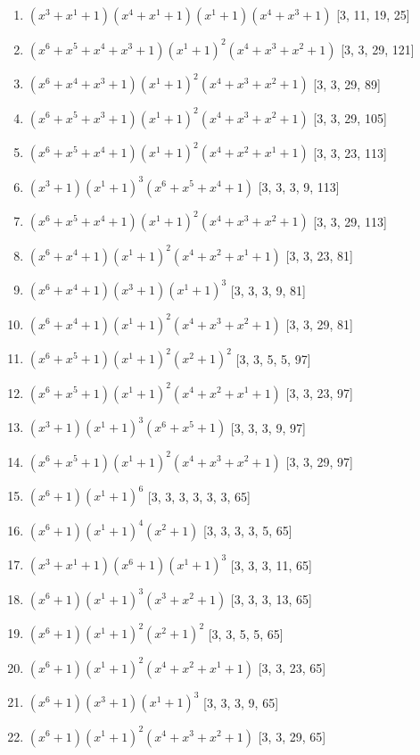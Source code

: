 \documentclass[10pt,twocolumn]{article}
\begin{document}
\begin{enumerate}
\item $(x^{3} + x^{1} + 1)(x^{4} + x^{1} + 1)(x^{1} + 1)(x^{4} + x^{3} + 1)$  [3, 11, 19, 25]
\item $(x^{6} + x^{5} + x^{4} + x^{3} + 1)(x^{1} + 1)^{2}(x^{4} + x^{3} + x^{2} + 1)$  [3, 3, 29, 121]
\item $(x^{6} + x^{4} + x^{3} + 1)(x^{1} + 1)^{2}(x^{4} + x^{3} + x^{2} + 1)$  [3, 3, 29, 89]
\item $(x^{6} + x^{5} + x^{3} + 1)(x^{1} + 1)^{2}(x^{4} + x^{3} + x^{2} + 1)$  [3, 3, 29, 105]
\item $(x^{6} + x^{5} + x^{4} + 1)(x^{1} + 1)^{2}(x^{4} + x^{2} + x^{1} + 1)$  [3, 3, 23, 113]
\item $(x^{3} + 1)(x^{1} + 1)^{3}(x^{6} + x^{5} + x^{4} + 1)$  [3, 3, 3, 9, 113]
\item $(x^{6} + x^{5} + x^{4} + 1)(x^{1} + 1)^{2}(x^{4} + x^{3} + x^{2} + 1)$  [3, 3, 29, 113]
\item $(x^{6} + x^{4} + 1)(x^{1} + 1)^{2}(x^{4} + x^{2} + x^{1} + 1)$  [3, 3, 23, 81]
\item $(x^{6} + x^{4} + 1)(x^{3} + 1)(x^{1} + 1)^{3}$  [3, 3, 3, 9, 81]
\item $(x^{6} + x^{4} + 1)(x^{1} + 1)^{2}(x^{4} + x^{3} + x^{2} + 1)$  [3, 3, 29, 81]
\item $(x^{6} + x^{5} + 1)(x^{1} + 1)^{2}(x^{2} + 1)^{2}$  [3, 3, 5, 5, 97]
\item $(x^{6} + x^{5} + 1)(x^{1} + 1)^{2}(x^{4} + x^{2} + x^{1} + 1)$  [3, 3, 23, 97]
\item $(x^{3} + 1)(x^{1} + 1)^{3}(x^{6} + x^{5} + 1)$  [3, 3, 3, 9, 97]
\item $(x^{6} + x^{5} + 1)(x^{1} + 1)^{2}(x^{4} + x^{3} + x^{2} + 1)$  [3, 3, 29, 97]
\item $(x^{6} + 1)(x^{1} + 1)^{6}$  [3, 3, 3, 3, 3, 3, 65]
\item $(x^{6} + 1)(x^{1} + 1)^{4}(x^{2} + 1)$  [3, 3, 3, 3, 5, 65]
\item $(x^{3} + x^{1} + 1)(x^{6} + 1)(x^{1} + 1)^{3}$  [3, 3, 3, 11, 65]
\item $(x^{6} + 1)(x^{1} + 1)^{3}(x^{3} + x^{2} + 1)$  [3, 3, 3, 13, 65]
\item $(x^{6} + 1)(x^{1} + 1)^{2}(x^{2} + 1)^{2}$  [3, 3, 5, 5, 65]
\item $(x^{6} + 1)(x^{1} + 1)^{2}(x^{4} + x^{2} + x^{1} + 1)$  [3, 3, 23, 65]
\item $(x^{6} + 1)(x^{3} + 1)(x^{1} + 1)^{3}$  [3, 3, 3, 9, 65]
\item $(x^{6} + 1)(x^{1} + 1)^{2}(x^{4} + x^{3} + x^{2} + 1)$  [3, 3, 29, 65]

\end{enumerate}
\end{document}
